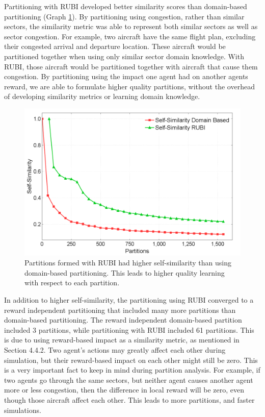 \documentclass[onehalf,11pt]{beavtex}
\begin{document}
Partitioning with RUBI developed better similarity scores than domain-based partitioning (Graph \ref{Self-SimOldvsSelf-SimNew}). By partitioning using congestion, rather than similar sectors, the similarity metric was able to represent both similar sectors as well as sector congestion. For example, two aircraft have the same flight plan, excluding their congested arrival and departure location. These aircraft would be partitioned together when using only similar sector domain knowledge. With RUBI, those aircraft would be partitioned together with aircraft that cause them congestion. By partitioning using the impact one agent had on another agents reward, we are able to formulate higher quality partitions, without the overhead of developing similarity metrics or learning domain knowledge.


\begin{figure}
\centering
\includegraphics[width=1.0\columnwidth]{Self-SimOldvsSelf-SimNew}
\caption{Partitions formed with RUBI had higher self-similarity than using domain-based partitioning. This leads to higher quality learning with respect to each partition.}
\label{Self-SimOldvsSelf-SimNew}
\end{figure}

In addition to higher self-similarity, the partitioning using RUBI converged to a reward independent partitioning that included many more partitions than domain-based partitioning. The reward independent domain-based partition included 3 partitions, while partitioning with RUBI included 61 partitions. This is due to using reward-based impact as a similarity metric, as mentioned in Section 4.4.2. Two agent's actions may greatly affect each other during simulation, but their reward-based impact on each other might still be zero. This is a very important fact to keep in mind during partition analysis. For example, if two agents go through the same sectors, but neither agent causes another agent more or less congestion, then the difference in local reward will be zero, even though those aircraft affect each other. This leads to more partitions, and faster simulations.
\end{document}
